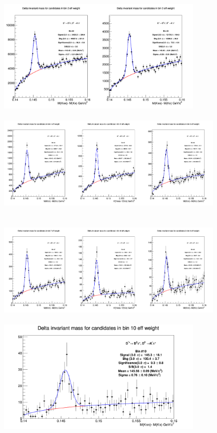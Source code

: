 \begin{figure}[!htp]
\centering
{\includegraphics[width=1\linewidth, height=5.6cm]{figuresVsCent/Dstar/MassPlots/020/InvMassDistributions_Dstar_Bins2to3.png}}
{\includegraphics[width=1\linewidth, height=5.6cm]{figuresVsCent/Dstar/MassPlots/020/InvMassDistributions_Dstar_Bins4to6.png}}
{\includegraphics[width=1\linewidth, height=5.6cm]{figuresVsCent/Dstar/MassPlots/020/InvMassDistributions_Dstar_Bins7to9.png}}
{\includegraphics[width=0.6\linewidth, height=5.6cm]{figuresVsCent/Dstar/MassPlots/020/InvMassDistributions_Dstar_Bins10to10.png}}


\end{figure}
